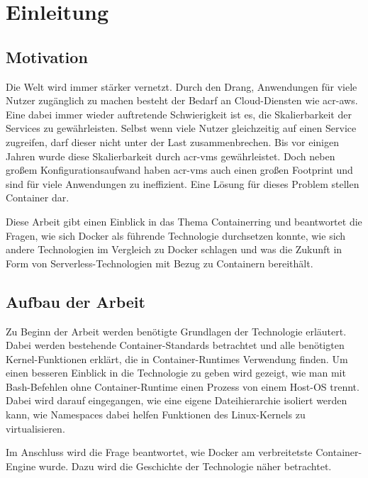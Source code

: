 \chapter{Einleitung}
\label{chap:einleitung}

\section{Motivation}
\label{sec:motivation}
Die Welt wird immer stärker vernetzt. Durch den Drang, Anwendungen für viele Nutzer zugänglich zu machen besteht der Bedarf an Cloud-Diensten wie \gls{acr-aws}.
Eine dabei immer wieder auftretende Schwierigkeit ist es, die Skalierbarkeit der Services zu gewährleisten. Selbst wenn viele Nutzer gleichzeitig auf einen Service zugreifen, darf dieser nicht unter der Last zusammenbrechen. Bis vor einigen Jahren wurde diese Skalierbarkeit durch \glspl{acr-vm} gewährleistet. Doch neben großem Konfigurationsaufwand haben \glspl{acr-vm} auch einen großen Footprint und sind für viele  Anwendungen zu ineffizient. Eine Lösung für dieses Problem stellen Container dar.

Diese Arbeit gibt einen Einblick in das Thema Containerring und beantwortet die Fragen, wie sich Docker als führende Technologie durchsetzen konnte, wie sich andere Technologien im Vergleich zu Docker schlagen und was die Zukunft in Form von Serverless-Technologien mit Bezug zu Containern bereithält.

\section{Aufbau der Arbeit}
\label{sec:aufbau}
Zu Beginn der Arbeit werden benötigte Grundlagen der Technologie erläutert. Dabei werden bestehende Container-Standards betrachtet und alle benötigten Kernel-Funktionen erklärt, die in Container-Runtimes Verwendung finden. Um einen besseren Einblick in die Technologie zu geben wird gezeigt, wie man mit Bash-Befehlen ohne Container-Runtime einen Prozess von einem Host-OS trennt. Dabei wird darauf eingegangen, wie eine eigene Dateihierarchie isoliert werden kann, wie Namespaces dabei helfen Funktionen des Linux-Kernels zu virtualisieren.

Im Anschluss wird die Frage beantwortet, wie Docker am verbreitetste Container-Engine wurde. Dazu wird die Geschichte der Technologie näher betrachtet.


